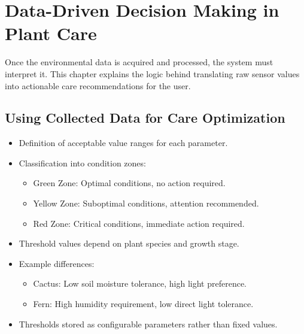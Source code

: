 \section{Data-Driven Decision Making in Plant Care}

Once the environmental data is acquired and processed, the system must interpret it. This chapter explains the logic behind translating raw sensor values into actionable care recommendations for the user.

\subsection{Using Collected Data for Care Optimization}
\begin{itemize}
    \item Definition of acceptable value ranges for each parameter.
    \item Classification into condition zones:
    \begin{itemize}
        \item Green Zone: Optimal conditions, no action required.
        \item Yellow Zone: Suboptimal conditions, attention recommended.
        \item Red Zone: Critical conditions, immediate action required.
    \end{itemize}
    \item Threshold values depend on plant species and growth stage.
    \item Example differences:
    \begin{itemize}
        \item Cactus: Low soil moisture tolerance, high light preference.
        \item Fern: High humidity requirement, low direct light tolerance.
    \end{itemize}
    \item Thresholds stored as configurable parameters rather than fixed values.
\end{itemize}


